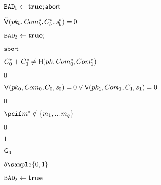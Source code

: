 \begin{figure}[htb!]
{{\begin{minipage}[t]{0.8\textwidth}
\begin{nicodemus}
                 \hfill{}
                \item \pcthen $\texttt{BAD}_1 \leftarrow \textbf{true};\mathsf{abort}$
                 \hfill{}
                 \item \pcif $\tilde{\mathsf{V}}(pk_b,Com^*_b,C^*_b,s^*_b) = 0$
                 \hfill{}
                 \item \pcthen $\texttt{BAD}_2 \leftarrow \textbf{true};$
                  \hfill{}
                 \item \quad $\mathsf{abort}$
                  \hfill{}
            	\item \pcif $C_0^*+C_1^* \neq \mathsf{H}(pk,Com^*_0,Com^*_1) $
		\item \quad \pcthen \pcreturn $0$
		\item \pcif $\mathsf{V}(pk_0,Com_0,C_0,s_0) = 0 \lor \mathsf{V}(pk_1,Com_1,C_1,s_1) =0$
		\item \quad \pcthen \pcreturn $0$
		 \item $\pcif m^* \notin \{m_1,..,m_q\} $
		 \item \quad \pcthen \pcreturn $0$
		\item \pcelse \pcreturn $1$
                

            \end{nicodemus}
        \end{minipage}
                       \begin{minipage}[t]{0.8\textwidth}
            \underline{$\mathsf{G}_4$}
            \begin{nicodemus}
            \item $b \sample \{0,1\}$
            \item $\texttt{BAD}_2 \leftarrow \textbf{true}$


\end{nicodemus}
\end{minipage}}}
\end{figure}
